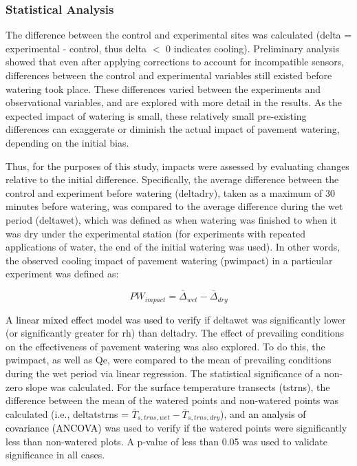\documentclass[final,3p,times,authoryear]{elsarticle}
\newcommand{\add}[1]{\textcolor{black}{#1}}
\newcommand{\remove}[1]{\textcolor{red}{\st{}}}
\begin{document}
\subsubsection{Statistical Analysis}\label{sec:methods2.2.3}

The difference between the control and experimental sites was calculated (\gls{delta} = experimental - control, thus \gls{delta} $<$ 0 indicates cooling). Preliminary analysis showed that even after applying corrections to account for incompatible sensors, differences between the control and experimental variables still existed before watering took place. These differences varied between the experiments and observational variables, and are explored with more detail in the results. As the expected impact of watering is small, these relatively small pre-existing differences can exaggerate or diminish the actual impact of pavement watering, depending on the initial bias.

Thus, for the purposes of this study, impacts were assessed by evaluating changes relative to the initial difference. Specifically, the average difference between the control and experiment before watering (\gls{deltadry}), taken as a maximum of 30 minutes before watering, was compared to the average difference during the wet period (\gls{deltawet}), which was defined as when watering was finished to when it was dry under the experimental station (for experiments with repeated applications of water, the end of the initial watering was used). In other words, the observed cooling impact of pavement watering (\gls{pwimpact}) in a particular experiment was defined as:

\begin{equation}
PW_{impact} = \bar{\Delta}_{wet} - \bar{\Delta}_{dry}
\label{eq:2.2} 
\end{equation}

\remove{An independent t-test was also conducted to verify}\add{A linear mixed effect model was used to verify} if \gls{deltawet} was significantly lower (or significantly greater for \gls{rh}) than \gls{deltadry}. The effect of prevailing conditions on the effectiveness of pavement watering was also explored. To do this, the \gls{pwimpact}, as well as \gls{Qe}, were compared to \add{the} mean of prevailing conditions during the wet period via linear regression. The statistical significance of a non-zero slope was calculated. For the surface temperature transects (\gls{tstrns}), the difference between the mean of the watered points and non-watered points was calculated (i.e., \gls{deltatstrns} = $\overline{T}_{s,trns,wet} - \overline{T}_{s,trns,dry}$), and \remove{a t-test was again}\add{an analysis of covariance (ANCOVA)} was used to verify if the watered points were significantly less than non-watered plots. A \gls{p}-value of less than 0.05 was used to validate significance in all cases.
\end{document}
